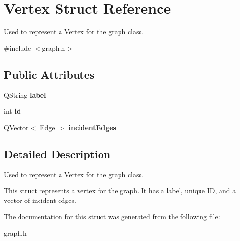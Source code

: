 \hypertarget{struct_vertex}{}\section{Vertex Struct Reference}
\label{struct_vertex}


Used to represent a \hyperlink{struct_vertex}{Vertex} for the graph class.  




{\ttfamily \#include $<$graph.\+h$>$}

\subsection*{Public Attributes}
\begin{DoxyCompactItemize}
\item 
\mbox{\label{struct_vertex_a60447a604e4decc34e1ef4f89909ac97}} 
Q\+String {\bfseries label}
\item 
\mbox{\label{struct_vertex_a2e69697726190f50c7fc040fb1ddac7a}} 
int {\bfseries id}
\item 
\mbox{\label{struct_vertex_a925bd1413228b69ba059c58bfa96b43c}} 
Q\+Vector$<$ \hyperlink{struct_edge}{Edge} $>$ {\bfseries incident\+Edges}
\end{DoxyCompactItemize}


\subsection{Detailed Description}
Used to represent a \hyperlink{struct_vertex}{Vertex} for the graph class. 

This struct represents a vertex for the graph. It has a label, unique ID, and a vector of incident edges. 

The documentation for this struct was generated from the following file\+:\begin{DoxyCompactItemize}
\item 
graph.\+h\end{DoxyCompactItemize}
